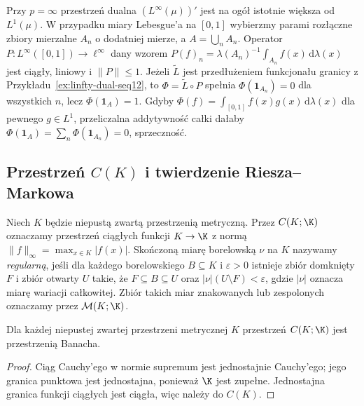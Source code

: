 \begin{uwaga}
\label{rem:linfty-dual12}
Przy $p=\infty$ przestrzeń dualna $(L^\infty(\mu))'$ jest
na ogół istotnie większa od $L^1(\mu)$. W przypadku miary
Lebesgue'a na $[0,1]$ wybierzmy parami rozłączne zbiory mierzalne
$A_n$ o dodatniej mierze, a $A=\bigcup_nA_n$. Operator
$P:L^\infty([0,1])\to\ell^\infty$ dany wzorem
$P(f)_n=\lambda(A_n)^{-1}\int_{A_n}f(x)\,\mathrm d\lambda(x)$
jest ciągły, liniowy i $\|P\|\le1$.
Jeżeli $\widetilde L$ jest przedłużeniem funkcjonału granicy
z Przykładu~\ref{ex:linfty-dual-seq12}, to $\Phi=\widetilde L\circ P$
spełnia $\Phi(\mathbf1_{A_n})=0$ dla wszystkich $n$, lecz
$\Phi(\mathbf1_A)=1$.
Gdyby $\Phi(f)=\int_{[0,1]}f(x)g(x)\,\mathrm d\lambda(x)$
dla pewnego $g\in L^1$, przeliczalna addytywność całki dałaby
$\Phi(\mathbf1_A)=\sum_n\Phi(\mathbf1_{A_n})=0$, sprzeczność.
\end{uwaga}

\subsection{Przestrzeń \texorpdfstring{$C(K)$}{C(K)} i twierdzenie Riesza--Markowa}

\begin{definicja}
\label{def:ck-measures12}
Niech $K$ będzie niepustą zwartą przestrzenią metryczną.
Przez $C(K;\K)$ oznaczamy przestrzeń ciągłych funkcji
$K\to\K$ z normą $\|f\|_\infty=\max_{x\in K}|f(x)|$.
Skończoną miarę borelowską $\nu$ na $K$ nazywamy
\emph{regularną}, jeśli dla każdego borelowskiego $B\subseteq K$
i $\varepsilon>0$ istnieje zbiór domknięty $F$ i zbiór otwarty
$U$ takie, że $F\subseteq B\subseteq U$ oraz
$|\nu|(U\setminus F)<\varepsilon$, gdzie $|\nu|$ oznacza
miarę wariacji całkowitej. Zbiór takich miar znakowanych
lub zespolonych oznaczamy przez $\mathcal M(K;\K)$.
\end{definicja}

\begin{stwierdzenie}[Zupełność $C(K)$]
\label{prop:ck-banach12}
Dla każdej niepustej zwartej przestrzeni metrycznej $K$
przestrzeń $C(K;\K)$ jest przestrzenią Banacha.
\end{stwierdzenie}
\begin{proof}
Ciąg Cauchy'ego w normie supremum jest jednostajnie Cauchy'ego;
jego granica punktowa jest jednostajna, ponieważ $\K$ jest zupełne.
Jednostajna granica funkcji ciągłych jest ciągła, więc należy do $C(K)$.
\end{proof}

